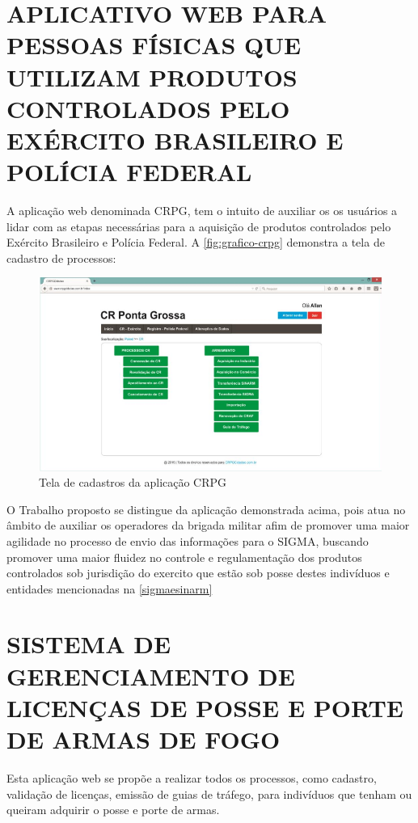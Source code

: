 \section{APLICATIVO WEB PARA PESSOAS FÍSICAS QUE UTILIZAM PRODUTOS CONTROLADOS PELO EXÉRCITO
BRASILEIRO E POLÍCIA FEDERAL}
A aplicação web denominada CRPG, tem o intuito de auxiliar os os usuários a lidar com as etapas necessárias para a aquisição de produtos controlados pelo Exército Brasileiro e Polícia Federal. A \autoref{fig:grafico-crpg} demonstra a tela de cadastro de processos:

\begin{figure}[htb]
    \caption{\label{fig:grafico-crpg}Tela de cadastros da aplicação CRPG}
    \begin{center}
        \includegraphics[scale=0.9]{imagens/crpg.png}
    \end{center}
\end{figure}

O Trabalho proposto se distingue da aplicação demonstrada acima, pois atua no âmbito de auxiliar os operadores da brigada militar afim de promover uma maior agilidade no processo de envio das informações para o SIGMA, buscando promover uma maior fluidez no controle e regulamentação dos produtos controlados sob jurisdição do exercito que estão sob posse destes indivíduos e entidades mencionadas na \autoref{sigmaesinarm}



\section{SISTEMA DE GERENCIAMENTO DE LICENÇAS DE POSSE E PORTE DE ARMAS DE FOGO}
Esta aplicação web se propõe a realizar todos os processos, como cadastro, validação de licenças, emissão de guias de tráfego, para indivíduos que tenham ou queiram adquirir o posse e porte de armas.


